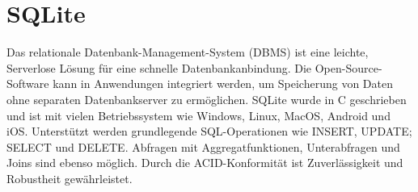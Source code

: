 \section{SQLite}
Das relationale Datenbank-Management-System (DBMS) ist eine leichte, Serverlose Lösung für eine schnelle Datenbankanbindung. Die Open-Source-Software kann in Anwendungen integriert werden, um Speicherung von Daten ohne separaten Datenbankserver zu ermöglichen. SQLite wurde in C geschrieben und ist mit vielen Betriebssystem wie Windows, Linux, MacOS, Android und iOS. Unterstützt werden grundlegende SQL-Operationen wie INSERT, UPDATE; SELECT und DELETE. Abfragen mit Aggregatfunktionen, Unterabfragen und Joins sind ebenso möglich. Durch die ACID-Konformität ist Zuverlässigkeit und Robustheit gewährleistet.